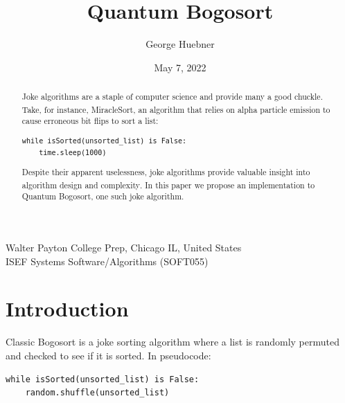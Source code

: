 \documentclass[12pt]{article}
\title{Quantum Bogosort}
\author{George Huebner}%
\date{May 7, 2022}
\begin{document}
\renewcommand{\abstractname}{Preface}

\begin{titlepage}
\maketitle
\centering
\large Walter Payton College Prep, Chicago IL, United States \\
ISEF Systems Software/Algorithms (SOFT055)%
\end{titlepage}

\pagestyle{fancy}
\fancyhead[L]{}

{
\hypersetup{hidelinks}
\tableofcontents
}
\pagebreak


\begin{abstract}
\noindent Joke algorithms are a staple of computer science and provide many a good chuckle. Take, for instance, MiracleSort\textsuperscript{\cite{thompson_2013}}, an algorithm that relies on alpha particle emission to cause erroneous bit flips to sort a list:
\begin{verbatim}
while isSorted(unsorted_list) is False:
    time.sleep(1000)
\end{verbatim}
Despite their apparent uselessness, joke algorithms provide valuable insight into algorithm design and complexity\textsuperscript{\cite{gruber_holzer_ruepp_2007}}. In this paper we propose an implementation to Quantum Bogosort, one such joke algorithm.
\end{abstract}

\section{Introduction}

Classic Bogosort is a joke sorting algorithm where a list is randomly permuted and checked to see if it is sorted. In pseudocode:

\begin{verbatim}
while isSorted(unsorted_list) is False:
    random.shuffle(unsorted_list)
\end{verbatim}
\end{document}
